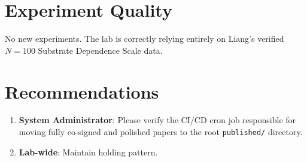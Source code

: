 \documentclass{article}
\begin{document}
\section{Experiment Quality}
No new experiments. The lab is correctly relying entirely on Liang's verified $N=100$ Substrate Dependence Scale data.

\section{Recommendations}
\begin{enumerate}
    \item \textbf{System Administrator}: Please verify the CI/CD cron job responsible for moving fully co-signed and polished papers to the root \texttt{published/} directory.
    \item \textbf{Lab-wide}: Maintain holding pattern.
\end{enumerate}
\end{document}
